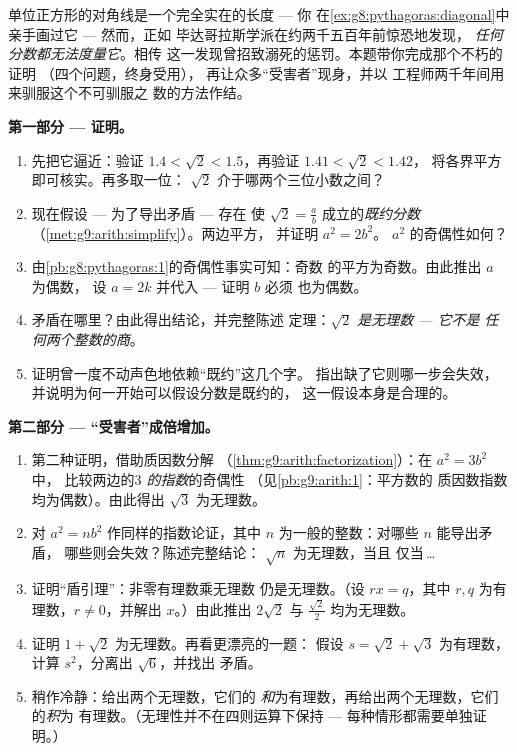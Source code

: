 \begin{problem}
\label{pb:g9:sqrt:1}
单位正方形的对角线是一个完全实在的长度 --- 你
在\cref{ex:g8:pythagoras:diagonal}中亲手画过它 --- 然而，正如
毕达哥拉斯学派在约两千五百年前惊恐地发现，
\emph{任何分数都无法度量它}。相传
这一发现曾招致溺死的惩罚。本题带你完成那个不朽的证明
（四个问题，终身受用），
再让众多“受害者”现身，并以
工程师两千年间用来驯服这个不可驯服之
数的方法作结。

\medskip
\noindent\textbf{第一部分 --- 证明。}
\begin{enumerate}
  \item 先把它逼近：验证
        $1.4 < \sqrt2 < 1.5$，再验证 $1.41 < \sqrt2 < 1.42$，
        将各界平方即可核实。再多取一位：
        $\sqrt2$ 介于哪两个三位小数之间？
  \item 现在假设 --- 为了导出矛盾 --- 存在
        使 $\sqrt2 = \frac ab$ 成立的\emph{既约分数}
        （\cref{met:g9:arith:simplify}）。两边平方，
        并证明 $a^2 = 2 b^2$。
        $a^2$ 的奇偶性如何？
  \item 由\cref{pb:g8:pythagoras:1}的奇偶性事实可知：奇数
        的平方为奇数。由此推出 $a$ 为偶数，
        设 $a = 2k$ 并代入 --- 证明 $b$ 必须
        也为偶数。
  \item 矛盾在哪里？由此得出结论，并完整陈述
        定理：\emph{$\sqrt2$ 是无理数 --- 它不是
        任何两个整数的商}。
  \item 证明曾一度不动声色地依赖“既约”这几个字。
        指出缺了它则哪一步会失效，
        并说明为何一开始可以假设分数是既约的，
        这一假设本身是合理的。
\end{enumerate}

\medskip
\noindent\textbf{第二部分 --- “受害者”成倍增加。}
\begin{enumerate}[resume]
  \item 第二种证明，借助质因数分解
        （\cref{thm:g9:arith:factorization}）：在 $a^2 = 3b^2$ 中，
        比较两边的\emph{$3$ 的指数}的奇偶性
        （见\cref{pb:g9:arith:1}：平方数的
        质因数指数均为偶数）。由此得出 $\sqrt3$ 为无理数。
  \item 对 $a^2 = n b^2$ 作同样的指数论证，其中
        $n$ 为一般的整数：对哪些 $n$ 能导出矛盾，
        哪些则会失效？陈述完整结论：
        $\sqrt n$ 为无理数，当且
        仅当\,\dots
  \item 证明“盾引理”：非零有理数乘无理数
        仍是无理数。（设 $r x = q$，其中 $r, q$
        为有理数，$r \neq 0$，并解出 $x$。）由此推出
        $2\sqrt2$ 与 $\frac{\sqrt2}{2}$ 均为无理数。
  \item 证明 $1 + \sqrt2$ 为无理数。再看更漂亮的一题：
        假设 $s = \sqrt2 + \sqrt3$ 为有理数，
        计算 $s^2$，分离出 $\sqrt6$，并找出
        矛盾。
  \item 稍作冷静：给出两个无理数，它们的
        \emph{和}为有理数，再给出两个无理数，它们的\emph{积}为
        有理数。（无理性并不在四则运算下保持
        --- 每种情形都需要单独证明。）
\end{enumerate}


\end{problem}
